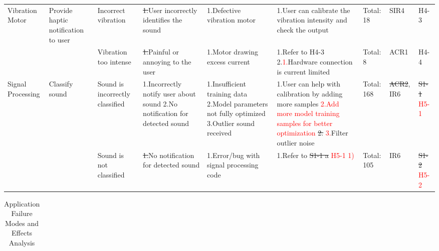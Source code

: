 \documentclass[12pt, titlepage]{article}
\begin{document}
\begin{landscape}
\begin{table}[H]
\begin{tabular}{| p{} | p{}  | p{} | p{} | p{} | p{} | p{} | p{} | p{} |}
        Vibration Motor & Provide haptic notification to user &  Incorrect vibration & \sout{1.}User incorrectly identifies the sound & 1.Defective vibration motor & 1.User can calibrate the vibration intensity and check the output  & Total: 18 & SIR4 & H4-3 \\ \cline{3-9}
     
         & & Vibration too intense & \sout{1.}Painful or annoying to the user & 1.Motor drawing excess current & \sout{1.Refer to H4-3 \newline 2.}\textcolor{red}{1.}Hardware connection is current limited & Total: 8 & ACR1 & H4-4 \\ \hline
     
         Signal Processing & Classify sound & Sound is incorrectly classified & 1.Incorrectly notify user about sound \newline 2.No notification for detected sound & 1.Insufficient training data \newline 2.Model parameters not fully optimized \newline 3.Outlier sound received  & 1.User can help with calibration by adding more samples \newline \textcolor{red}{2.Add more model training samples for better optimization} \newline \sout{2.} \textcolor{red}{3.}Filter outlier noise  & Total: 168 & \sout{ACR2}, IR6 & \sout{S1-1} \textcolor{red}{H5-1} \\ \cline{3-9}
    
     & & Sound is not classified & \sout{1.}No notification for detected sound & 1.Error/bug with signal processing code & 1.Refer to \sout{S1-1 a} \textcolor{red}{H5-1 1)} & Total: 105 & IR6 & \sout{S1-2} \textcolor{red}{H5-2} \\ \hline

        
        \end{tabular}

\end{table}



\begin{table}[H]

    \caption{Application Failure Modes and Effects Analysis}	
    \centering
    \begin{tabular}{| p{} | p{}  | p{} | p{} | p{} | p{} | p{} | p{} | p{} |}
        \hline
    

\end{tabular}
\end{table}
\end{landscape}
\end{document}
